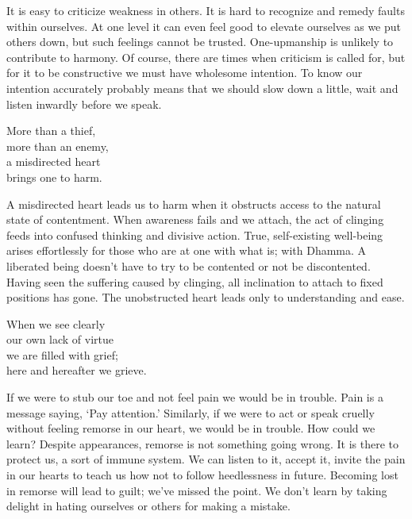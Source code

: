 \begin{dhpRefl}
  It is easy to criticize weakness in others. It is hard to recognize and remedy
  faults within ourselves. At one level it can even feel good to elevate
  ourselves as we put others down, but such feelings cannot be trusted.
  One-upmanship is unlikely to contribute to harmony. Of course, there are times
  when criticism is called for, but for it to be constructive we must have
  wholesome intention. To know our intention accurately probably means that we
  should slow down a little, wait and listen inwardly before we speak.
\end{dhpRefl}


\begin{dhpVerse}{42}
\label{dhp-42}
More than a thief,\\
more than an enemy,\\
a misdirected heart\\
brings one to harm.
\end{dhpVerse}

\begin{dhpRefl}
  A misdirected heart leads us to harm when it obstructs access to the natural
  state of contentment. When awareness fails and we attach, the act of clinging
  feeds into confused thinking and divisive action. True, self-existing
  well-being arises effortlessly for those who are at one with what is; with
  Dhamma. A liberated being doesn't have to try to be contented or not be
  discontented. Having seen the suffering caused by clinging, all inclination to
  attach to fixed positions has gone. The unobstructed heart leads only to
  understanding and ease.
\end{dhpRefl}


\begin{dhpVerse}{15}
\label{dhp-15}
When we see clearly\\
our own lack of virtue\\
we are filled with grief;\\
here and hereafter we grieve.
\end{dhpVerse}

\begin{dhpRefl}
  If we were to stub our toe and not feel pain we would be in trouble. Pain is a
  message saying, `Pay attention.' Similarly, if we were to act or speak cruelly
  without feeling remorse in our heart, we would be in trouble. How could we
  learn? Despite appearances, remorse is not something going wrong. It is there
  to protect us, a sort of immune system. We can listen to it, accept it, invite
  the pain in our hearts to teach us how not to follow heedlessness in future.
  Becoming lost in remorse will lead to guilt; we've missed the point. We don’t
  learn by taking delight in hating ourselves or others for making a mistake.
\end{dhpRefl}

